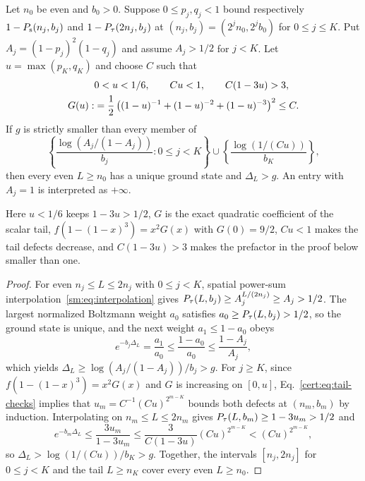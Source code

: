 \begin{proposition}
\label{cert:prop:prefix}
Let $n_0$ be even and $b_0>0$. Suppose $0\le p_j,q_j<1$ bound respectively
$1-P_{\mathrm s}(n_j,b_j)$ and $1-P_{\tau}(2n_j,b_j)$ at
$(n_j,b_j)=(2^jn_0,2^jb_0)$ for $0\le j\le K$.
Put $A_j=(1-p_j)^2(1-q_j)$ and assume $A_j>1/2$ for $j<K$.
Let $u=\max(p_K,q_K)$ and choose $C$ such that
\begin{align}
 &0<u<1/6,\qquad Cu<1,\qquad C(1-3u)>3,\notag \\
 G(u):&=\frac12\left((1-u)^{-1}+(1-u)^{-2}
                         +(1-u)^{-3}\right)^2\le C.
 \label{cert:eq:tail-checks}
\end{align}
If $g$ is strictly smaller than every member of
\begin{equation}
 \left\{\frac{\log(A_j/(1-A_j))}{b_j}:0\le j<K\right\}
 \cup\left\{\frac{\log(1/(Cu))}{b_K}\right\},
 \label{cert:eq:prefix-minimum}
\end{equation}
then every even $L\ge n_0$ has a unique ground state and
$\Delta_L>g$. An entry with $A_j=1$ is interpreted as $+\infty$.
\end{proposition}
\noindent Here $u<1/6$ keeps $1-3u>1/2$, $G$ is the exact quadratic
coefficient of the scalar tail, $f(1-(1-x)^3)=x^2G(x)$ with $G(0)=9/2$,
$Cu<1$ makes the tail defects decrease, and $C(1-3u)>3$ makes the
prefactor in the proof below smaller than one.

\begin{proof}
For even $n_j\le L\le2n_j$ with $0\le j<K$, spatial power-sum
interpolation~\eqref{sm:eq:interpolation} gives
$P_{\tau}(L,b_j)\ge A_j^{L/(2n_j)}\ge A_j>1/2$.
The largest normalized Boltzmann weight $a_0$ satisfies $a_0\ge P_{\tau}(L,b_j)>1/2$,
so the ground state is unique, and the next weight $a_1\le1-a_0$ obeys
\begin{equation}
 e^{-b_j\Delta_L}=\frac{a_1}{a_0}
 \le\frac{1-a_0}{a_0}\le\frac{1-A_j}{A_j},
 \label{cert:eq:interval-gap}
\end{equation}
which yields $\Delta_L\ge\log(A_j/(1-A_j))/b_j>g$.
For $j\ge K$, since $f(1-(1-x)^3)=x^2G(x)$ and $G$ is increasing on
$[0,u]$, Eq.~\eqref{cert:eq:tail-checks} implies that $u_m=C^{-1}(Cu)^{2^{m-K}}$
bounds both defects at $(n_m,b_m)$ by induction. Interpolating on
$n_m\le L\le2n_m$ gives $P_{\tau}(L,b_m)\ge1-3u_m>1/2$ and
\[
 e^{-b_m\Delta_L}\le\frac{3u_m}{1-3u_m}
 \le\frac{3}{C(1-3u)}(Cu)^{2^{m-K}}<(Cu)^{2^{m-K}},
\]
so $\Delta_L>\log(1/(Cu))/b_K>g$. Together, the intervals $[n_j,2n_j]$
for $0\le j<K$ and the tail $L\ge n_K$ cover every even $L\ge n_0$.
\end{proof}

